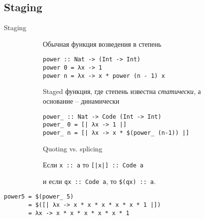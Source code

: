 \subsection{Staging}


\begin{frame}[fragile]{Staging}
\begin{figure}[ht]
\begin{subfigure}[t]{.59\textwidth}
Обычная функция возведения в степень
\begin{verbatim}
power :: Nat -> (Int -> Int)
power 0 = λx -> 1
power n = λx -> x * power (n - 1) x
\end{verbatim}
Staged функция, где степень известна \emph{статически}, а основание -- динамически
\begin{verbatim}
power_ :: Nat -> Code (Int -> Int)
power_ 0 = [| λx -> 1 |]
power_ n = [| λx -> x * $(power_ (n-1)) |]
\end{verbatim}
\end{subfigure}
\hspace{.1\textwidth}
\begin{subfigure}[t]{.29\textwidth}
Quoting vs. splicing 
\vspace{1em}

Если \verb=x :: a= то \verb=[|x|] :: Code a= 
\vspace{1em}

и если  \verb=qx :: Code a=, то \verb=$(qx) :: a=.

\end{subfigure}
\end{figure}
\begin{center}
\begin{minipage}{10cm}
\begin{verbatim}
power5 = $(power_ 5)
       = $([| λx -> x * x * x * x * x * 1 |])
       = λx -> x * x * x * x * x * 1
\end{verbatim}
\end{minipage}
\end{center}
\end{frame}


